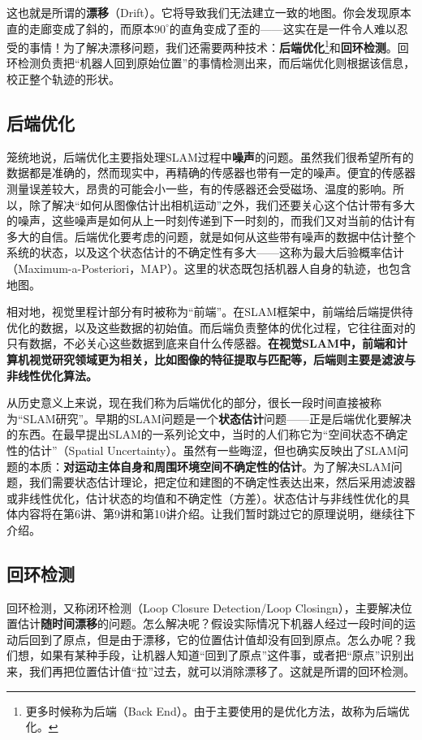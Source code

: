 这也就是所谓的\textbf{漂移}（Drift）。它将导致我们无法建立一致的地图。你会发现原本直的走廊变成了斜的，而原本$90^\circ$的直角变成了歪的——这实在是一件令人难以忍受的事情！为了解决漂移问题，我们还需要两种技术：\textbf{后端优化}\footnote{更多时候称为后端（Back End）。由于主要使用的是优化方法，故称为后端优化。}和\textbf{回环检测}。回环检测负责把“机器人回到原始位置”的事情检测出来，而后端优化则根据该信息，校正整个轨迹的形状。

\subsection{后端优化}
笼统地说，后端优化主要指处理SLAM过程中\textbf{噪声}的问题。虽然我们很希望所有的数据都是准确的，然而现实中，再精确的传感器也带有一定的噪声。便宜的传感器测量误差较大，昂贵的可能会小一些，有的传感器还会受磁场、温度的影响。所以，除了解决“如何从图像估计出相机运动”之外，我们还要关心这个估计带有多大的噪声，这些噪声是如何从上一时刻传递到下一时刻的，而我们又对当前的估计有多大的自信。后端优化要考虑的问题，就是如何从这些带有噪声的数据中估计整个系统的状态，以及这个状态估计的不确定性有多大——这称为最大后验概率估计（Maximum-a-Posteriori，MAP）。这里的状态既包括机器人自身的轨迹，也包含地图。

相对地，视觉里程计部分有时被称为“前端”。在SLAM框架中，前端给后端提供待优化的数据，以及这些数据的初始值。而后端负责整体的优化过程，它往往面对的只有数据，不必关心这些数据到底来自什么传感器。\textbf{在视觉SLAM中，前端和计算机视觉研究领域更为相关，比如图像的特征提取与匹配等，后端则主要是滤波与非线性优化算法。}

从历史意义上来说，现在我们称为后端优化的部分，很长一段时间直接被称为“SLAM研究”。早期的SLAM问题是一个\textbf{状态估计}问题——正是后端优化要解决的东西。在最早提出SLAM的一系列论文中，当时的人们称它为“空间状态不确定性的估计”（Spatial Uncertainty）\textsuperscript{\cite{Smith1986, Smith1990}}。虽然有一些晦涩，但也确实反映出了SLAM问题的本质：\textbf{对运动主体自身和周围环境空间不确定性的估计}。为了解决SLAM问题，我们需要状态估计理论，把定位和建图的不确定性表达出来，然后采用滤波器或非线性优化，估计状态的均值和不确定性（方差）。状态估计与非线性优化的具体内容将在第6讲、第9讲和第10讲介绍。让我们暂时跳过它的原理说明，继续往下介绍。

\subsection{回环检测}

回环检测，又称闭环检测（Loop Closure Detection/Loop Closingn），主要解决位置估计\textbf{随时间漂移}的问题。怎么解决呢？假设实际情况下机器人经过一段时间的运动后回到了原点，但是由于漂移，它的位置估计值却没有回到原点。怎么办呢？我们想，如果有某种手段，让机器人知道“回到了原点”这件事，或者把“原点”识别出来，我们再把位置估计值“拉”过去，就可以消除漂移了。这就是所谓的回环检测。

